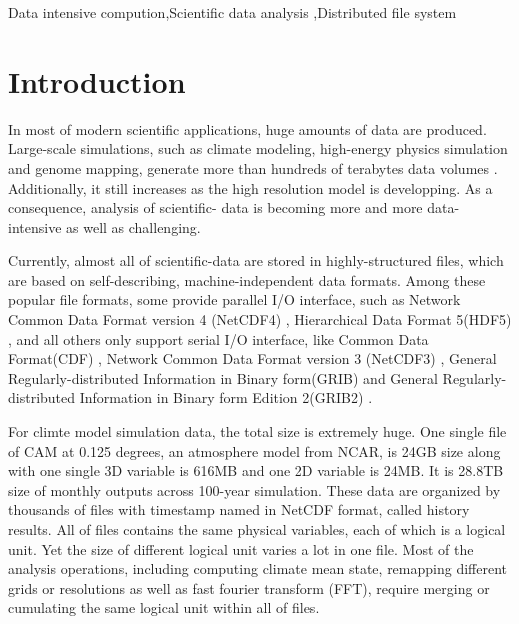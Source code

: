 \documentclass[preprint,12pt]{elsarticle}
\begin{document}
\begin{frontmatter}
\begin{keyword}


Data intensive compution\sep Scientific data analysis \sep Distributed file system 
\end{keyword}

\end{frontmatter}

\linenumbers

\section{Introduction}
In most of modern scientific applications, huge amounts of data are produced. Large-scale simulations, such as climate modeling,
high-energy physics simulation and genome mapping, generate more than hundreds of terabytes data volumes \cite{kosar2009new} 
\cite{hey2003data}. Additionally, it still increases as the high resolution model is developping. As a consequence, analysis of scientific-
data is becoming more and more data-intensive as well as challenging.\par

Currently, almost all of scientific-data are stored in highly-structured files, which are based on self-describing, machine-independent 
data formats. Among these popular file formats, some provide parallel I/O interface, such as Network Common Data Format version 4 
(NetCDF4) \cite{rew2006netcdf}, Hierarchical Data Format 5(HDF5) \cite{folk1999hdf5}, and all others only support serial I/O interface, like 
Common Data Format(CDF) \cite{cdf}, Network Common Data Format version 3 (NetCDF3) \cite{rew1990netcdf}, General Regularly-distributed 
Information in Binary form(GRIB) \cite{grib} and General Regularly-distributed Information in Binary form Edition 2(GRIB2) \cite{grib2}.\par

For climte model simulation data, the total size is extremely huge. One single file of CAM at 0.125 degrees, an atmosphere model from 
NCAR\cite{neale2010description}, is 24GB size along with one single 3D variable is 616MB and one 2D variable is 24MB. It is 28.8TB size of 
monthly outputs across 100-year simulation\cite{jacob2012new}. These data are organized by thousands of files with timestamp named in NetCDF 
format, called history results. All of files contains the same physical variables, each of which is a logical unit. Yet the size of different 
logical unit varies a lot in one file. Most of the analysis operations, including computing climate mean state, remapping different grids or
resolutions as well as fast fourier transform (FFT), require merging or cumulating the same logical unit within all of files. \par 
\end{document}
